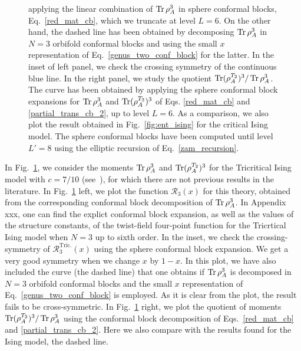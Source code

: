 \documentclass[a4paper,11pt]{article}
\def\Tr{\mathop{\mbox{\normalfont Tr}}\nolimits}
\begin{document}
\begin{figure}[t]
{applying the linear combination of $\Tr\rho_A^3$ in sphere conformal blocks, Eq.~\eqref{red_mat_cb}, 
which we truncate at level $L=6$. On the other hand, the dashed line has been obtained by decomposing $\Tr\rho_A^3$ in 
$N=3$ orbifold conformal blocks and using the small $x$ representation of Eq.~\eqref{genus_two_conf_block}  for the latter. In the 
inset of left panel, we check the crossing symmetry of the continuous blue line. In the right panel, 
we study the quotient $\Tr(\rho_A^{T_2})^3/\Tr\rho_A^3$. The curve has been obtained by applying 
the sphere conformal block expansions for $\Tr\rho_A^3$ and $\Tr(\rho_A^{T_2})^3$ of Eqs. \eqref{red_mat_cb} and \eqref{partial_trans_cb_2}, 
up to level $L=6$. As a comparison, we also plot the result obtained in Fig.~\ref{fig:ent_ising} for the critical Ising model.
The sphere conformal blocks have been computed until level $L'= 8$ using the elliptic recursion of Eq.~\eqref{zam_recursion}.}\label{fig:ent_tricritical}

\end{figure}

In Fig.~\ref{fig:ent_tricritical}, we consider the moments $\Tr\rho_A^3$ and 
$\Tr(\rho_A^{T_2})^3$ for the Tricritical Ising model with $c=7/10$ (see~\cite{Mussardo}), for which there are not 
previous results in the literature. In Fig.~\ref{fig:ent_tricritical} left, we plot 
the function $\mathcal{R}_3(x)$ for this theory, obtained from the corresponding conformal block 
decomposition of $\Tr\rho_A^3$. In Appendix xxx, one can find the explict conformal block expansion, 
as well as the values of the structure constants, of the twist-field four-point function for the 
Tricrtical Ising model when $N=3$ up to sixth order. In the inset, we check the crossing-symmetry 
of $\mathcal{R}_3^{\text{Tric.}}(x)$ using the sphere conformal block expansion. We get a very good 
symmetry when we change $x$ by $1-x$. In this plot, we have also included the curve (the dashed line)
that one obtains if $\Tr\rho_A^3$ is decomposed in $N=3$ orbifold conformal blocks and the 
small $x$ representation of Eq.~\eqref{genus_two_conf_block} is employed. As it is clear from the plot, the result 
fails to be cross-symmetric.
In Fig.~\ref{fig:ent_tricritical} right, we plot the quotient 
of moments $\Tr(\rho_A^{T_2})^3/\Tr\rho_A^3$ using the conformal block decomposition of Eqs.~\eqref{red_mat_cb} and \eqref{partial_trans_cb_2}.  Here we also compare with the results found for the Ising model, the dashed line. 
\end{document}
